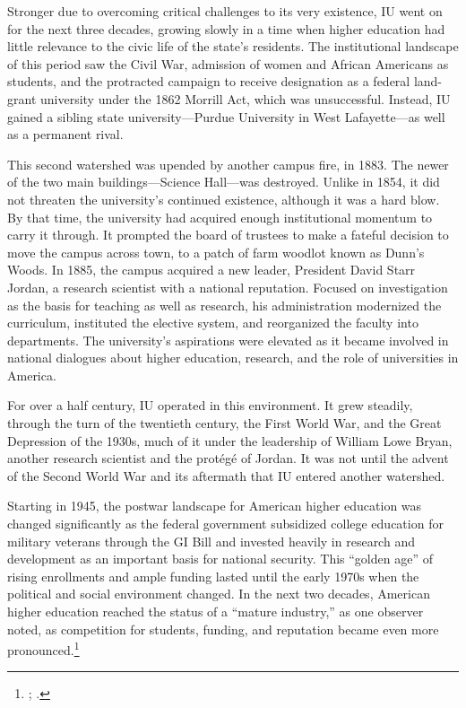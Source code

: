 \documentclass[
  american,
  letterpaper,
]{scrreprt}
\begin{document}
Stronger due to overcoming critical challenges to its very existence, IU
went on for the next three decades, growing slowly in a time when higher
education had little relevance to the civic life of the state's
residents. The institutional landscape of this period saw the Civil War,
admission of women and African Americans as students, and the protracted
campaign to receive designation as a federal land-grant university under
the 1862 Morrill Act, which was unsuccessful. Instead, IU gained a
sibling state university---Purdue University in West Lafayette---as well
as a permanent rival.

This second watershed was upended by another campus fire, in 1883. The
newer of the two main buildings---Science Hall---was destroyed. Unlike
in 1854, it did not threaten the university's continued existence,
although it was a hard blow. By that time, the university had acquired
enough institutional momentum to carry it through. It prompted the board
of trustees to make a fateful decision to move the campus across town,
to a patch of farm woodlot known as Dunn's Woods. In 1885, the campus
acquired a new leader, President David Starr Jordan, a research
scientist with a national reputation. Focused on investigation as the
basis for teaching as well as research, his administration modernized
the curriculum, instituted the elective system, and reorganized the
faculty into departments. The university's aspirations were elevated as
it became involved in national dialogues about higher education,
research, and the role of universities in America.

For over a half century, IU operated in this environment. It grew
steadily, through the turn of the twentieth century, the First World
War, and the Great Depression of the 1930s, much of it under the
leadership of William Lowe Bryan, another research scientist and the
protégé of Jordan. It was not until the advent of the Second World War
and its aftermath that IU entered another watershed.

Starting in 1945, the postwar landscape for American higher education
was changed significantly as the federal government subsidized college
education for military veterans through the GI Bill and invested heavily
in research and development as an important basis for national security.
This ``golden age'' of rising enrollments and ample funding lasted until
the early 1970s when the political and social environment changed. In
the next two decades, American higher education reached the status of a
``mature industry,'' as one observer noted, as competition for students,
funding, and reputation became even more pronounced.\footnote{; .}
\end{document}
